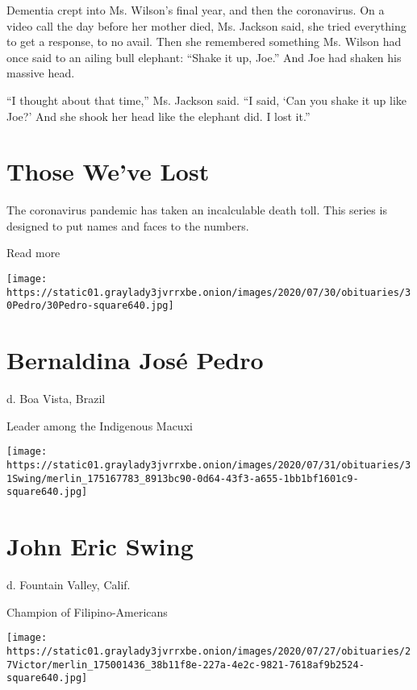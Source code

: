 Dementia crept into Ms. Wilson's final year, and then the coronavirus.
On a video call the day before her mother died, Ms. Jackson said, she
tried everything to get a response, to no avail. Then she remembered
something Ms. Wilson had once said to an ailing bull elephant: ``Shake
it up, Joe.'' And Joe had shaken his massive head.

``I thought about that time,'' Ms. Jackson said. ``I said, `Can you
shake it up like Joe?' And she shook her head like the elephant did. I
lost it.''

\href{https://www.nytimes3xbfgragh.onion/interactive/2020/obituaries/people-died-coronavirus-obituaries.html?action=click\&pgtype=Article\&state=default\&region=BELOW_MAIN_CONTENT\&context=covid_obits_promo}{}

\hypertarget{those-weve-lost}{%
\section{Those We've Lost}\label{those-weve-lost}}

The coronavirus pandemic has taken an incalculable death toll. This
series is designed to put names and faces to the numbers.

Read more

\texttt{[image: https://static01.graylady3jvrrxbe.onion/images/2020/07/30/obituaries/30Pedro/30Pedro-square640.jpg]}

\hypertarget{bernaldina-josuxe9-pedro}{%
\section{Bernaldina José Pedro}\label{bernaldina-josuxe9-pedro}}

d. Boa Vista, Brazil

Leader among the Indigenous Macuxi

\texttt{[image: https://static01.graylady3jvrrxbe.onion/images/2020/07/31/obituaries/31Swing/merlin\_175167783\_8913bc90-0d64-43f3-a655-1bb1bf1601c9-square640.jpg]}

\hypertarget{john-eric-swing}{%
\section{John Eric Swing}\label{john-eric-swing}}

d. Fountain Valley, Calif.

Champion of Filipino-Americans

\texttt{[image: https://static01.graylady3jvrrxbe.onion/images/2020/07/27/obituaries/27Victor/merlin\_175001436\_38b11f8e-227a-4e2c-9821-7618af9b2524-square640.jpg]}

